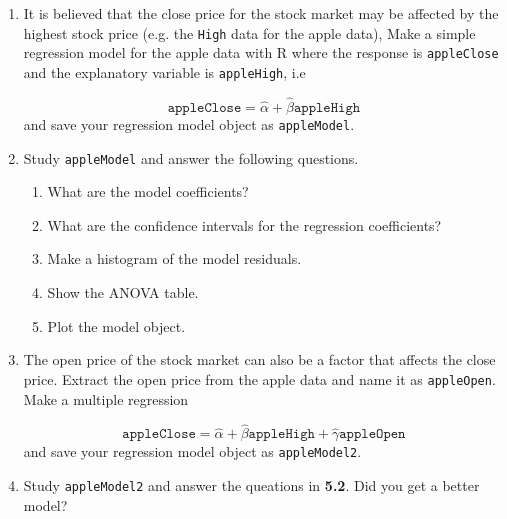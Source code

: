 \documentclass[a4paper]{article}
\begin{document}
\section{}
\begin{enumerate}
\item It is believed that the close price for the stock market may be affected
  by the highest stock price (e.g. the \texttt{High} data for the apple data),
  Make a simple regression model for the apple data with R where the response
  is \texttt{appleClose} and the explanatory variable is \texttt{appleHigh}, i.e 

  \begin{equation*}
    \mathtt{appleClose} = \hat \alpha + \hat \beta \mathtt{appleHigh} 
  \end{equation*}
  and save your regression model object as \texttt{appleModel}.

\item Study \texttt{appleModel} and answer the following questions.
  \begin{enumerate}
  \item What are the model coefficients?
    
  \item What are the confidence intervals for the regression coefficients?
 
  \item Make a histogram of the model residuals.

  \item Show the ANOVA table.

  \item Plot the model object.

  \end{enumerate}

\item The open price of the stock market can also be a factor that affects the
  close price. Extract the open price from the apple data and name it as
  \texttt{appleOpen}. Make a multiple regression 
 
  \begin{equation*}
    \mathtt{appleClose} = \hat \alpha + \hat \beta \mathtt{appleHigh} + \hat \gamma \mathtt{appleOpen} 
  \end{equation*}
  and save your regression model object as \texttt{appleModel2}.

 \item Study \texttt{appleModel2} and answer the queations in \textbf{5.2}. Did
   you get a better model?


\end{enumerate}
\end{document}
